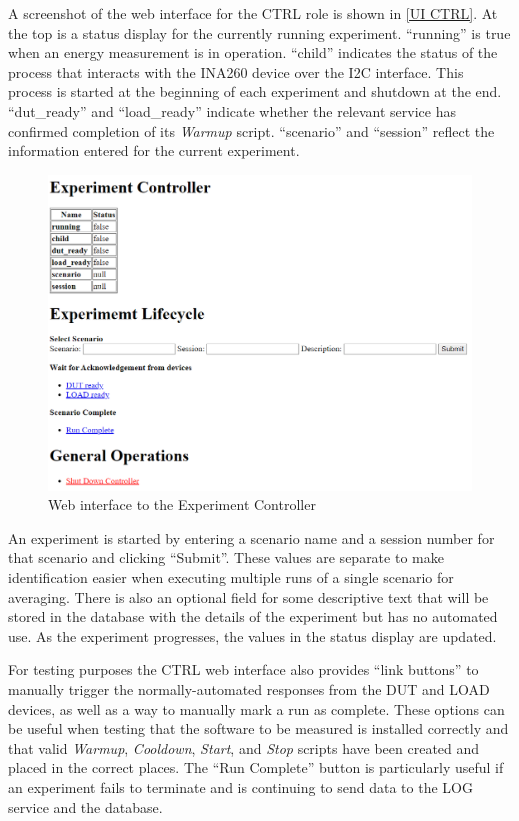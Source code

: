 A screenshot of the web interface for the CTRL role is shown in \autoref{UI CTRL}. At the top is a status display for the currently running experiment. \enquote{running} is true when an energy measurement is in operation. \enquote{child} indicates the status of the process that interacts with the INA260 device over the I2C interface. This process is started at the beginning of each experiment and shutdown at the end. \enquote{dut\_ready} and \enquote{load\_ready} indicate whether the relevant service has confirmed completion of its \emph{Warmup} script. \enquote{scenario} and \enquote{session} reflect the information entered for the current experiment.

\begin{figure}[ht!]
\centering
\includegraphics[width=\columnwidth]{Figures/screenshots/Controller.png}
\caption{Web interface to the Experiment Controller}
\label{UI CTRL}
\end{figure}

An experiment is started by entering a scenario name and a session number for that scenario and clicking \enquote{Submit}. These values are separate to make identification easier when executing multiple runs of a single scenario for averaging. There is also an optional field for some descriptive text that will be stored in the database with the details of the experiment but has no automated use. As the experiment progresses, the values in the status display are updated.

For testing purposes the CTRL web interface also provides \enquote{link buttons} to manually trigger the normally-automated responses from the DUT and LOAD devices, as well as a way to manually mark a run as complete. These options can be useful when testing that the software to be measured is installed correctly and that valid \emph{Warmup}, \emph{Cooldown}, \emph{Start}, and \emph{Stop} scripts have been created and placed in the correct places. The \enquote{Run Complete} button is particularly useful if an experiment fails to terminate and is continuing to send data to the LOG service and the database.

